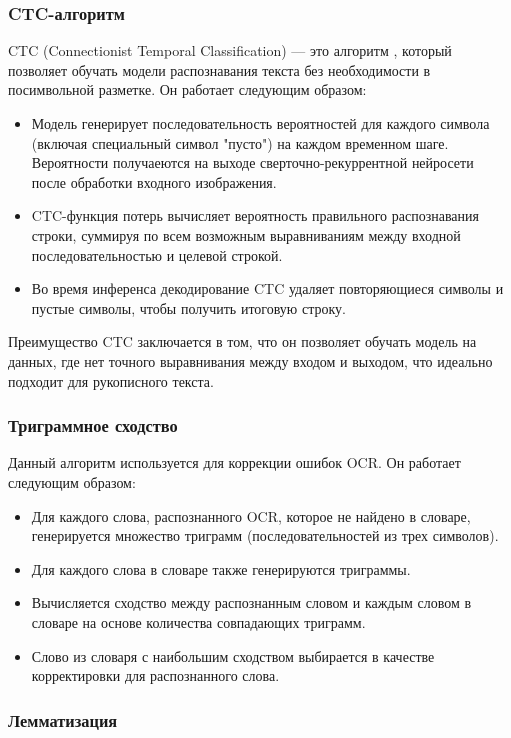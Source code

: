 \documentclass[12pt,a4paper]{article}
\begin{document}
\subsubsection{CTC-алгоритм}
CTC (Connectionist Temporal Classification) — это алгоритм \cite{ctc2006}, который позволяет обучать модели
распознавания текста без необходимости в посимвольной разметке. Он работает следующим образом:
\begin{itemize}
    \item Модель генерирует последовательность вероятностей для каждого символа (включая специальный символ "пусто") на каждом временном шаге.
    Вероятности получаеются на выходе сверточно-рекуррентной нейросети после обработки входного изображения.
    \item CTC-функция потерь вычисляет вероятность правильного распознавания строки, суммируя по всем возможным выравниваниям между входной последовательностью и целевой строкой.
    \item Во время инференса декодирование CTC удаляет повторяющиеся символы и пустые символы, чтобы получить итоговую строку.
\end{itemize}

Преимущество CTC заключается в том, что он позволяет обучать модель на данных, где нет точного выравнивания между входом и выходом, что идеально подходит для рукописного текста.

\subsubsection{Триграммное сходство}

Данный алгоритм используется для коррекции ошибок OCR. Он работает следующим образом:
\begin{itemize}
    \item Для каждого слова, распознанного OCR, которое не найдено в словаре,
    генерируется множество триграмм (последовательностей из трех символов).
    \item Для каждого слова в словаре также генерируются триграммы.
    \item Вычисляется сходство между распознанным словом и каждым словом в 
    словаре на основе количества совпадающих триграмм.
    \item Слово из словаря с наибольшим сходством выбирается в качестве корректировки для распознанного слова.
\end{itemize}

\subsubsection{Лемматизация}
\end{document}
